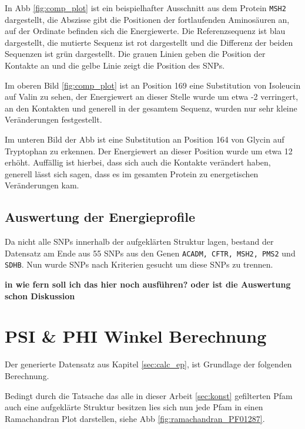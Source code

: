 In \ac{Abb} \ref{fig:comp_plot} ist ein beispielhafter Ausschnitt aus dem Protein \texttt{MSH2} dargestellt, die Abszisse gibt die Positionen der fortlaufenden Aminosäuren an, auf der Ordinate befinden sich die Energiewerte. Die Referenzsequenz ist blau dargestellt, die mutierte Sequenz ist rot dargestellt und die Differenz der beiden Sequenzen ist grün dargestellt. Die grauen Linien geben die Position der Kontakte an und die gelbe Linie zeigt die Position des \ac{SNP}s.

Im oberen Bild \ref{fig:comp_plot} ist an Position 169 eine Substitution von Isoleucin auf Valin zu sehen, der Energiewert an dieser Stelle wurde um etwa -2 verringert, an den Kontakten und generell in der gesamtem Sequenz, wurden nur sehr kleine Veränderungen festgestellt.

Im unteren Bild der \ac{Abb} ist eine Substitution an Position 164 von Glycin auf Tryptophan zu erkennen. Der Energiewert an dieser Position wurde um etwa 12 erhöht. Auffällig ist hierbei, dass sich auch die Kontakte verändert haben, generell lässt sich sagen, dass es im gesamten Protein zu energetischen Veränderungen kam.


\subsection{Auswertung der Energieprofile}

Da nicht alle SNPs innerhalb der aufgeklärten Struktur lagen, bestand der Datensatz am Ende aus 55 \ac{SNP}s aus den Genen \texttt{ACADM, CFTR, MSH2, PMS2} und \texttt{SDHB}. Nun wurde \ac{SNP}s nach Kriterien gesucht um diese SNPs zu trennen.


\textbf{in wie fern soll ich das hier noch ausführen? oder ist die Auswertung schon Diskussion}





\newpage
\section{PSI \& PHI Winkel Berechnung}

Der generierte Datensatz aus Kapitel \ref{sec:calc_ep}, ist Grundlage der folgenden Berechnung.

Bedingt durch die Tatsache das alle in dieser Arbeit \ref{sec:konst} gefilterten \ac{Pfam} auch eine aufgeklärte Struktur besitzen lies sich nun jede \ac{Pfam} in einen Ramachandran Plot darstellen, siehe \ac{Abb} \ref{fig:ramachandran_PF01287}.

